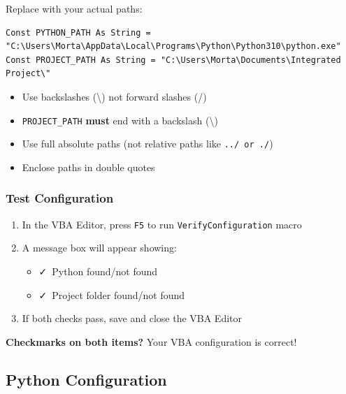 \documentclass[11pt,a4paper]{article}
\begin{document}
Replace with your actual paths:

\begin{lstlisting}[style=vbastyle, caption=Example Configuration]
Const PYTHON_PATH As String = "C:\Users\Morta\AppData\Local\Programs\Python\Python310\python.exe"
Const PROJECT_PATH As String = "C:\Users\Morta\Documents\Integrated Project\"
\end{lstlisting}

\begin{warningbox}[title=Path Format Rules]
\begin{itemize}
    \item Use backslashes (\textbackslash) not forward slashes (/)
    \item \texttt{PROJECT\_PATH} \textbf{must} end with a backslash (\textbackslash)
    \item Use full absolute paths (not relative paths like \texttt{../ or ./})
    \item Enclose paths in double quotes
\end{itemize}
\end{warningbox}

\subsubsection{Test Configuration}

\begin{enumerate}[leftmargin=*]
    \item In the VBA Editor, press \texttt{F5} to run \texttt{VerifyConfiguration} macro
    \item A message box will appear showing:
    \begin{itemize}
        \item \faCheck\ Python found/not found
        \item \faCheck\ Project folder found/not found
    \end{itemize}
    \item If both checks pass, save and close the VBA Editor
\end{enumerate}

\begin{successbox}[title=Configuration Successful]
\textbf{Checkmarks on both items?} Your VBA configuration is correct!
\end{successbox}

\newpage

\subsection{Python Configuration}
\end{document}
